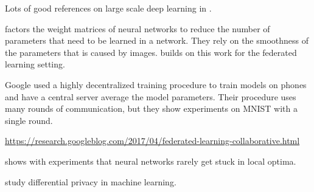 \documentclass[twoside]{article}
\begin{document}

\begin{abstract}
\end{abstract}


Lots of good references on large scale deep learning in \cite{dean2012large}.

\cite{denil2013predicting} factors the weight matrices of neural networks to reduce the number of parameters that need to be learned in a network.
They rely on the smoothness of the parameters that is caused by images.
\cite{konevcny2016federated} builds on this work for the federated learning setting.

Google used a highly decentralized training procedure to train models on phones and have a central server average the model parameters.
Their procedure uses many rounds of communication, but they show experiments on MNIST with a single round.
\cite{mcmahan2016federated}

\url{https://research.googleblog.com/2017/04/federated-learning-collaborative.html}

\cite{goodfellow2014qualitatively} shows with experiments that neural networks rarely get stuck in local optima.

\cite{shokri2015privacy,abadi2016deep} study differential privacy in machine learning.


\clearpage



\end{document}
